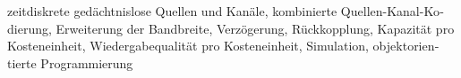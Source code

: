 \kern-5pt
\begin{otherlanguage}{german}
\begin{keywords}
  zeitdiskrete gedächtnislose Quellen und Kanäle, kombinierte
  Quellen-Kanal-Kodierung, Erweiterung der Bandbreite, Verzögerung,
  Rückkopplung, Kapazität pro Kosteneinheit, Wiedergabequalität pro
  Kosteneinheit, Simulation, objektorientierte Programmierung
\end{keywords}
\end{otherlanguage}
